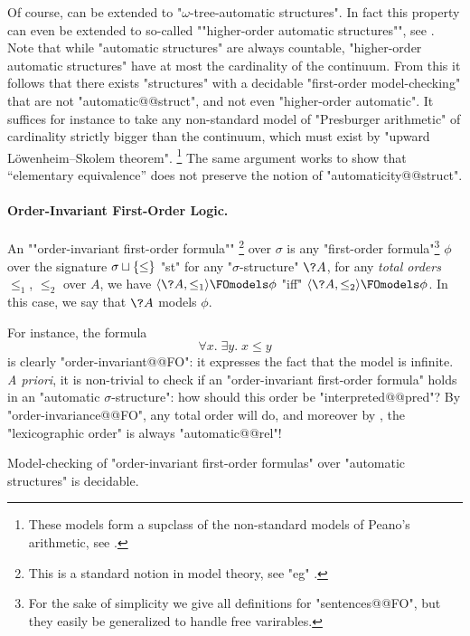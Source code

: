 Of course,  can be extended
to "$\omega$-tree-automatic structures".
In fact this property can even be extended to so-called
\AP""higher-order automatic structures"", see
\cite[last remark of \S~XII.2]{Blumensath2024MSOModelTheory}.
Note that while "automatic structures" are always countable,
"higher-order automatic structures" have at most the cardinality of the continuum.%
From this it follows that there exists "structures" with a decidable "first-order model-checking" that are not "automatic@@struct", and not even "higher-order automatic".
It suffices for instance to take any non-standard model of "Presburger arithmetic"
of cardinality strictly bigger than the continuum, which must exist by
"upward Löwenheim–Skolem theorem".%
\footnote{These models form a supclass of the non-standard models of Peano's arithmetic,
see \cite[Ex.~2, p.~36 \& \S~11.4]{Hodges1993ModelTheory}.}
The same argument works to show that ``elementary equivalence''
does not preserve the notion of "automaticity@@struct".

\paragraph*{Order-Invariant First-Order Logic.}
An \AP""order-invariant first-order formula""%
\footnote{This is a standard notion in model theory, see "eg"
\cite[Exercise~3.1.12]{Gradel2007FiniteModelTheory}.}
over $\sigma$
is any "first-order formula"\footnote{For the sake of simplicity we give all definitions
for "sentences@@FO", but they easily be generalized to handle free varirables.} $\phi$
over the signature $\sigma \sqcup \{\leq\}$ "st" for any
"$\sigma$-structure" $\?A$, for any \emph{total orders} $\leq_1$, $\leq_2$ over $A$,
we have $\tup{\?A, \leq_1} \FOmodels \phi$ "iff" $\tup{\?A, \leq_2} \FOmodels \phi$.
In this case, we say that $\?A$ models $\phi$.

For instance, the formula
\[
	\forall x.\; \exists y.\; x \leq y
\]
is clearly "order-invariant@@FO": it expresses the fact that the model is infinite.
\emph{A priori}, it is non-trivial to check if an "order-invariant first-order formula" holds in an
"automatic $\sigma$-structure": how should this order be "interpreted@@pred"?
By "order-invariance@@FO", any total order will do, and moreover by
, the "lexicographic order" is always "automatic@@rel"!

\begin{proposition}
	\label{prop:order-invariance}
	Model-checking of "order-invariant first-order formulas" over "automatic structures"
	is decidable.
\end{proposition}

